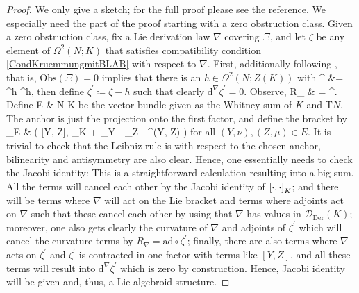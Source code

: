 \begin{proof}
\leavevmode\newline
We only give a sketch; for the full proof please see the reference. We especially need the part of the proof starting with a zero obstruction class. Given a zero obstruction class, fix a Lie derivation law $\nabla$ covering $\Xi$, and let $\zeta$ be any element of  $\Omega^2(N; K)$ that satisfies compatibility condition \eqref{CondKruemmungmitBLAB} with respect to $\nabla$. First, additionally following \cite[Proposition 7.2.13; page 277]{mackenzieGeneralTheory}, that is, $\mathrm{Obs}(\Xi) = 0$ implies that there is an $h \in \Omega^2(N; Z(K))$ with
\bas
{}^\nabla \zeta 
&=
^\Xi h
^\nabla h,
\eas 
then define $\zeta^\prime \coloneqq \zeta - h$ such that clearly $\mathrm{d}^\nabla \zeta^\prime = 0$. Observe,
\bas
R_\nabla
&\stackrel{ \eqref{CondKruemmungmitBLAB} }{=}
\circ\zeta
=
 \circ \zeta^\prime.
\eas
Define 
\bas
E 
&\coloneqq
{}N \oplus K
\eas
be the vector bundle given as the Whitney sum of $K$ and $\mathrm{T}N$. The anchor is just the projection onto the first factor, and define the bracket by
\bas
\mleft[
	(Y, \nu), (Z, \mu)
\mright]_E
&\coloneqq
\mleft(
	[Y, Z], \mleft[ \nu, \mu \mright]_K + \nabla_Y \mu - \nabla_Z \nu - \zeta^\prime(Y, Z)
\mright)
\eas
for all $(Y, \nu), (Z, \mu) \in E$. It is trivial to check that the Leibniz rule is with respect to the chosen anchor, bilinearity and antisymmetry are also clear. Hence, one essentially needs to check the Jacobi identity: This is a straightforward calculation resulting into a big sum. All the terms will cancel each other by the Jacobi identity of $\mleft[ \cdot, \cdot \mright]_K$; and there will be terms where $\nabla$ will act on the Lie bracket and terms where adjoints act on $\nabla$ such that these cancel each other by using that $\nabla$ has values in $\mathcal{D}_{\mathrm{Der}}(K)$; moreover, one also gets clearly the curvature of $\nabla$ and adjoints of $\zeta^\prime$ which will cancel the curvature terms by $R_\nabla = \mathrm{ad} \circ \zeta^\prime$; finally, there are also terms where $\nabla$ acts on $\zeta^\prime$ and $\zeta^\prime$ is contracted in one factor with terms like $[Y, Z]$, and all these terms will result into $\mathrm{d}^\nabla \zeta^\prime$ which is zero by construction. Hence, Jacobi identity will be given and, thus, a Lie algebroid structure.


\end{proof}
